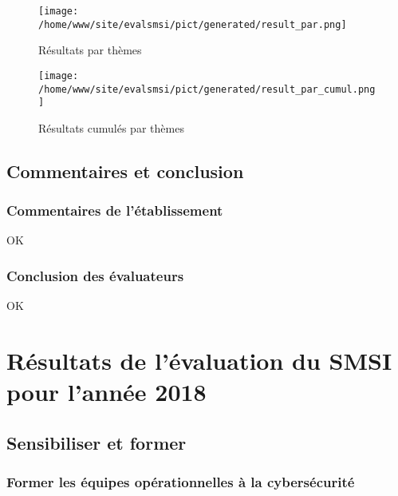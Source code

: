 \begin{figure}[ht]
\begin{center}\texttt{[image: /home/www/site/evalsmsi/pict/generated/result\_par.png]}\end{center}
\caption{Résultats par thèmes}
\end{figure}

\begin{figure}[ht]
\begin{center}\texttt{[image: /home/www/site/evalsmsi/pict/generated/result\_par\_cumul.png]}\end{center}
\caption{Résultats cumulés par thèmes}
\end{figure}

\subsection{Commentaires et conclusion}

\subsubsection{Commentaires de l'établissement}

\par
OK\par

\par\subsubsection{Conclusion des évaluateurs}

\par
OK
\par\clearpage


\section{Résultats de l'évaluation du SMSI pour l'année 2018}

\subsection{Sensibiliser et former}

\subsubsection{Former les équipes opérationnelles à la cybersécurité}

